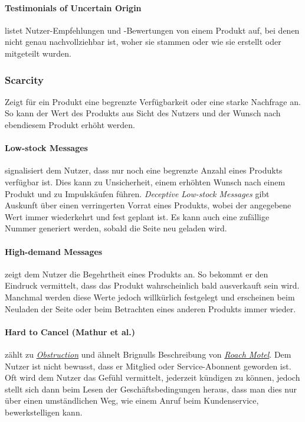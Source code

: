 \documentclass[a4paper]{article}
\begin{document}
\paragraph{Testimonials of Uncertain Origin}
\label{para:testimonials_of_uncertain_origin}
listet Nutzer-Empfehlungen und -Bewertungen von einem Produkt auf, bei denen nicht genau nachvollziehbar ist, woher sie stammen oder wie sie erstellt oder mitgeteilt wurden. 

\subsubsection{Scarcity}
\label{sssec:scarcity}
Zeigt für ein Produkt eine begrenzte Verfügbarkeit oder eine starke Nachfrage an. So kann der Wert des Produkts aus Sicht des Nutzers und der Wunsch nach ebendiesem Produkt erhöht werden.

\paragraph{Low-stock Messages}
\label{para:low_stock_messages}
signalisiert dem Nutzer, dass nur noch eine begrenzte Anzahl eines Produkts verfügbar ist. Dies kann zu Unsicherheit, einem erhöhten Wunsch nach einem Produkt und zu Impulskäufen führen. \textit{Deceptive Low-stock Messages} gibt Auskunft über einen verringerten Vorrat eines Produkts, wobei der angegebene Wert immer wiederkehrt und fest geplant ist. Es kann auch eine zufällige Nummer generiert werden, sobald die Seite neu geladen wird. 

\paragraph{High-demand Messages}
\label{para:high_demand_messages}
zeigt dem Nutzer die Begehrtheit eines Produkts an. So bekommt er den Eindruck vermittelt, dass das Produkt wahrscheinlich bald ausverkauft sein wird. Manchmal werden diese Werte jedoch willkürlich festgelegt und erscheinen beim Neuladen der Seite oder beim Betrachten eines anderen Produkts immer wieder.

\paragraph{Hard to Cancel (Mathur et al.)}
\label{para:hard_to_cancel}
zählt zu \hyperref[sssec:obstruction]{\textit{Obstruction}} und ähnelt Brignulls Beschreibung von \hyperref[para:roach_motel]{\textit{Roach Motel}}.\newline
Dem Nutzer ist nicht bewusst, dass er Mitglied oder Service-Abonnent geworden ist. Oft wird dem Nutzer das Gefühl vermittelt, jederzeit kündigen zu können, jedoch stellt sich dann beim Lesen der Geschäftsbedingungen heraus, dass man dies nur über einen umständlichen Weg, wie einem Anruf beim Kundenservice, bewerkstelligen kann. 
\end{document}
